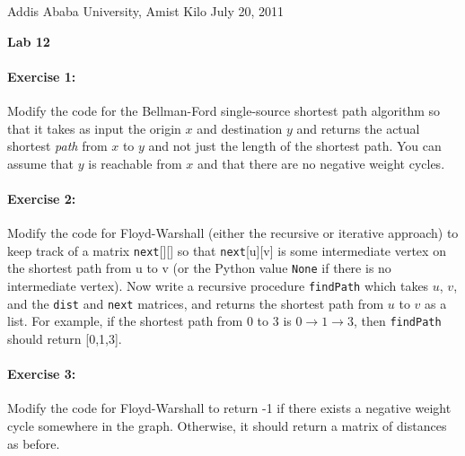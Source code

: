 \documentclass[11pt]{article}
\newlength{\toppush}
\newcommand{\htitle}[2]{\noindent\vspace*{-\toppush}\newline\parbox{6.5in}
 {\large Addis Ababa University, Amist Kilo \hfill #1\newline
\hspace*{\fill}{\bf Algorithms and Programming for High Schoolers} \hspace*{\fill} \newline
\mbox{}\hrulefill\mbox{}}\vspace*{1ex}\mbox{}\newline
\begin{center}{\Large\bf #2}\end{center}}
\begin{document}
\htitle{July 20, 2011}{Lab 12}

\paragraph{Exercise 1:}
Modify the code for the Bellman-Ford single-source shortest path
algorithm so that it takes as input the origin $x$ and destination $y$
and returns the actual shortest {\em path} from $x$ to $y$ and not
just the length of the shortest path.  You can assume that $y$ is
reachable from $x$ and that there are no negative weight cycles.

\paragraph{Exercise 2:}
Modify the code for Floyd-Warshall (either the recursive or iterative
approach) to keep track of a matrix \texttt{next}[][] so that
\texttt{next}[u][v] is some intermediate vertex on the shortest path
from u to v (or the Python value \texttt{None} if there is no
intermediate vertex).  Now write a recursive procedure
\texttt{findPath} which
takes $u$, $v$, and the \texttt{dist} and \texttt{next} matrices, and
returns the shortest path from $u$ to $v$ as a list.  For example, if
the shortest path from $0$ to $3$ is $0\rightarrow 1\rightarrow 3$,
then \texttt{findPath} should return [0,1,3].

\paragraph{Exercise 3:}
Modify the code for Floyd-Warshall to return -1 if there exists a
negative weight cycle somewhere in the graph.  Otherwise, it should
return a matrix of distances as before.
\end{document}
